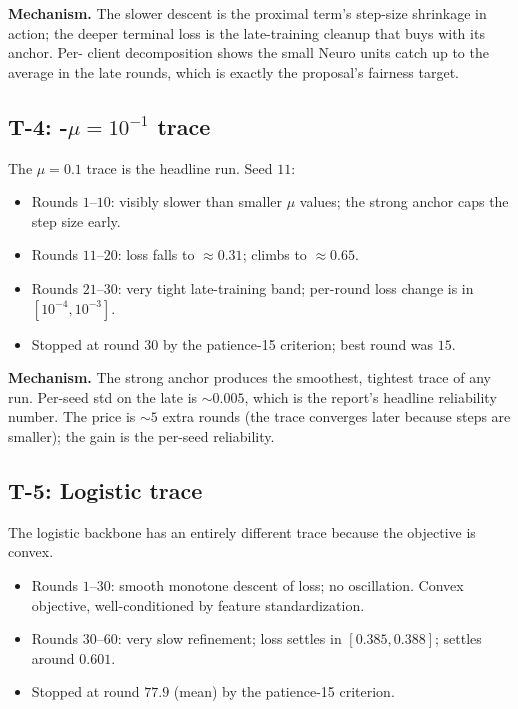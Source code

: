 \textbf{Mechanism.} The slower descent is the proximal term's
step-size shrinkage in action; the deeper terminal loss is the
late-training cleanup that \fedprox{} buys with its anchor. Per-
client decomposition shows the small Neuro units catch up to the
average in the late rounds, which is exactly the proposal's
fairness target.

\subsection{T-4: \fedprox{}-$\mu\!=\!10^{-1}$ trace}

The $\mu\!=\!0.1$ trace is the headline run. Seed $11$:

\begin{itemize}[leftmargin=1.5em, itemsep=2pt, topsep=2pt]
    \item Rounds $1$--$10$: visibly slower than smaller $\mu$
        values; the strong anchor caps the step size early.
    \item Rounds $11$--$20$: loss falls to $\approx 0.31$;
        \auprc{} climbs to $\approx 0.65$.
    \item Rounds $21$--$30$: very tight late-training band;
        per-round loss change is in $[10^{-4}, 10^{-3}]$.
    \item Stopped at round $30$ by the patience-15 criterion;
        best round was $15$.
\end{itemize}

\textbf{Mechanism.} The strong anchor produces the smoothest,
tightest trace of any run. Per-seed std on the late \auprc{} is
$\sim$$0.005$, which is the report's headline reliability number.
The price is $\sim$$5$ extra rounds (the trace converges later
because steps are smaller); the gain is the per-seed reliability.

\subsection{T-5: Logistic \fedavg{} trace}

The logistic backbone has an entirely different trace because the
objective is convex.

\begin{itemize}[leftmargin=1.5em, itemsep=2pt, topsep=2pt]
    \item Rounds $1$--$30$: smooth monotone descent of loss; no
        oscillation. Convex objective, well-conditioned by
        feature standardization.
    \item Rounds $30$--$60$: very slow refinement; loss settles
        in $[0.385, 0.388]$; \auprc{} settles around $0.601$.
    \item Stopped at round $77.9$ (mean) by the patience-15
        criterion.
\end{itemize}

